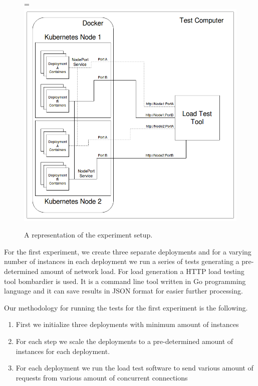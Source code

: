 \documentclass[12pt,oneandhalf,chaparabic,ceng,ms,eng,oneside,pntc]{gsufbe}
\makeatletter
\let\old@includegraphics\includegraphics
\renewcommand{\includegraphics}[2][,]{%
  \setbox9=\hbox{\old@includegraphics[#1]{#2}}%
  \ifdim\wd9>\textwidth
    \old@includegraphics[#1,width=\textwidth]{#2}%
  \else
    \old@includegraphics[#1]{#2}%
  \fi%
}
\makeatother
\begin{document}
\begin{figure}
\centering
\includegraphics[]{experiment.png}
\caption{A representation of the experiment setup.}
\label{fig:experiment}
\end{figure}

For the first experiment, we create three separate deployments and for a varying number of
instances in each deployment we run a series of tests generating a pre-determined amount of network load.
For load generation a HTTP load testing tool bombardier is used.  It is a command line tool written in
Go programming language and it can save results in JSON format for easier further processing. 

Our methodology for running the tests for the first experiment is the following.  
\begin{enumerate}
 \item First we initialize three deployments with minimum amount of instances
 \item For each step we scale the deployments to a pre-determined amount of instances for each deployment.
 \item For each deployment we run the load test software to send various amount of requests from
 various amount of concurrent connections
\end{enumerate}
\end{document}

